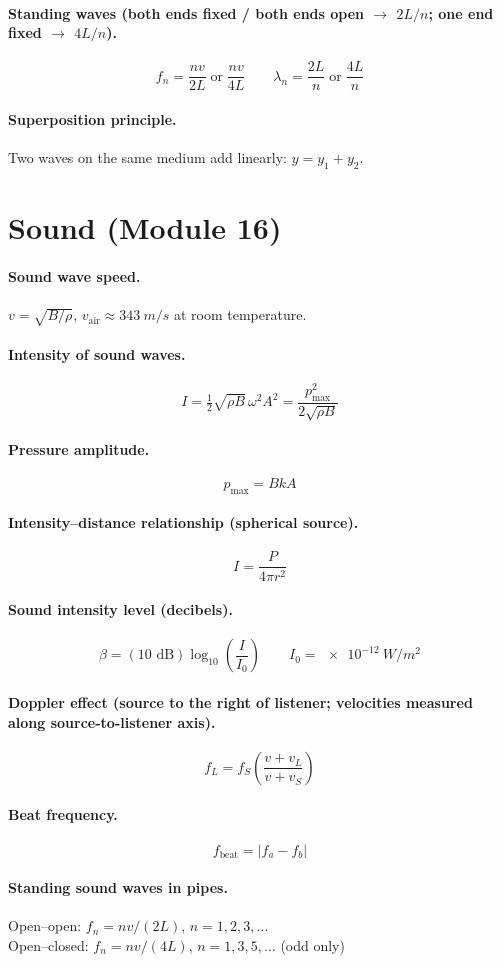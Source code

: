 \documentclass[11pt]{article}
\begin{document}
\paragraph{Standing waves (both ends fixed / both ends open $\to$ $2L/n$; one end fixed $\to$ $4L/n$).}
\[
f_{n} = \frac{n v}{2 L}\;\text{or}\;\frac{n v}{4 L}
\qquad
\lambda_{n} = \frac{2 L}{n}\;\text{or}\;\frac{4 L}{n}
\]

\paragraph{Superposition principle.} Two waves on the same medium add linearly: $y = y_1 + y_2$.

\section*{Sound (Module 16)}

\paragraph{Sound wave speed.} $v = \sqrt{B/\rho}$, $v_{\text{air}} \approx \SI{343}{m/s}$ at room temperature.

\paragraph{Intensity of sound waves.}
\[
I = \tfrac{1}{2}\sqrt{\rho B}\,\omega^{2} A^{2}
= \frac{p_{\max}^{2}}{2\sqrt{\rho B}}
\]

\paragraph{Pressure amplitude.}
\[
p_{\max} = B k A
\]

\paragraph{Intensity--distance relationship (spherical source).}
\[
I = \frac{P}{4\pi r^{2}}
\]

\paragraph{Sound intensity level (decibels).}
\[
\beta = (10\text{ dB})\log_{10}\!\left(\frac{I}{I_{0}}\right)
\qquad
I_{0} = \SI{e-12}{W/m^{2}}
\]

\paragraph{Doppler effect (source to the right of listener; velocities measured along source-to-listener axis).}
\[
f_{L} = f_{S}\left(\frac{v + v_{L}}{v + v_{S}}\right)
\]

\paragraph{Beat frequency.}
\[
f_{\text{beat}} = |f_{a} - f_{b}|
\]

\paragraph{Standing sound waves in pipes.}
Open--open: $f_{n} = n v/(2L)$, $n = 1,2,3,\dots$\\
Open--closed: $f_{n} = n v/(4L)$, $n = 1,3,5,\dots$ (odd only)
\end{document}
